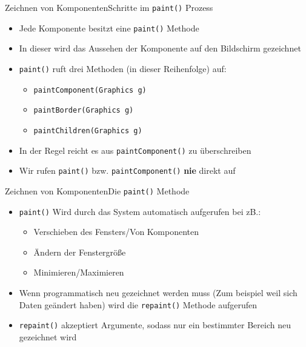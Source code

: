 \begin{frame}{Zeichnen von Komponenten}{Schritte im \texttt{paint()} Prozess}
    \begin{itemize}
        \item Jede Komponente besitzt eine \texttt{paint()} Methode
        \item In dieser wird das Aussehen der Komponente auf den Bildschirm gezeichnet
        \item \texttt{paint()} ruft drei Methoden (in dieser Reihenfolge) auf:
        \begin{itemize}
            \item \texttt{paintComponent(Graphics g)}
            \item \texttt{paintBorder(Graphics g)}
            \item \texttt{paintChildren(Graphics g)}
        \end{itemize}
        \item In der Regel reicht es aus \texttt{paintComponent()} zu überschreiben
        \item Wir rufen \texttt{paint()} bzw. \texttt{paintComponent()} \textbf{nie} direkt auf
    \end{itemize}
\end{frame}

\begin{frame}{Zeichnen von Komponenten}{Die \texttt{paint()} Methode}
    \begin{itemize}
        \item \texttt{paint()} Wird durch das System automatisch aufgerufen bei zB.:
        \begin{itemize}
            \item Verschieben des Fensters/Von Komponenten
            \item Ändern der Fenstergröße
            \item Minimieren/Maximieren
        \end{itemize}
        \item Wenn programmatisch neu gezeichnet werden muss (Zum beispiel weil sich Daten geändert haben) wird die \texttt{repaint()} Methode aufgerufen
        \item \texttt{repaint()} akzeptiert Argumente, sodass nur ein bestimmter Bereich neu gezeichnet wird
    \end{itemize}
\end{frame}

